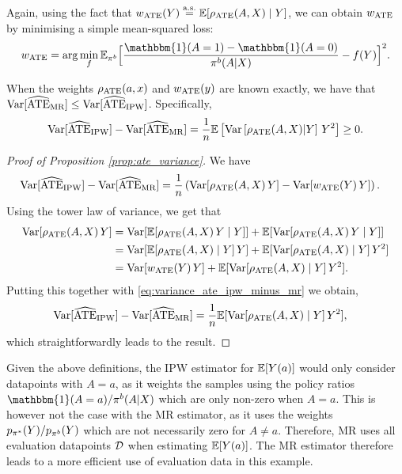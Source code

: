 Again, using the fact that $w_{\textup{ATE}}(Y) \overset{\mathrm{a.s.}}{=} \mathbb{E}[\rho_{\textup{ATE}}(A, X)\mid Y]$, we can obtain $w_{\textup{ATE}}$ by minimising a simple mean-squared loss:
\begin{align*}
    w_{\ate} =\arg \min_{f} \Ebeh \Big[\frac{\mathbbm{1}(A=1)- \mathbbm{1}(A=0)}{\beh (A|X)}-f(Y)\Big]^2.
\end{align*}
\begin{proposition}\label{prop:ate_variance}
When the weights $\rho_{\textup{ATE}}(a, x)$ and $w_{\textup{ATE}}(y)$ are known exactly, we have that $\textup{Var}[\widehat{\textup{ATE}}_{\textup{MR}}] \leq \textup{Var}[\widehat{\textup{ATE}}_{\textup{IPW}}]$. Specifically,
\begin{align*}
    \textup{Var}[\widehat{\textup{ATE}}_{\textup{IPW}}] - \textup{Var}[\widehat{\textup{ATE}}_{\textup{MR}}] = \frac{1}{n}\mathbb{E}\left[ \textup{Var}\left[\rho_{\textup{ATE}}(A, X) | Y \right]\,Y^2 \right] \geq 0.
\end{align*}
\end{proposition}
\begin{proof}[Proof of Proposition \ref{prop:ate_variance}] We have
\begin{align}
    \textup{Var}[\widehat{\textup{ATE}}_{\textup{IPW}}] - \textup{Var}[\widehat{\textup{ATE}}_{\textup{MR}}] &= \frac{1}{n}\left( \textup{Var}[\rho_{\textup{ATE}}(A, X)\, Y] - \textup{Var}[w_{\textup{ATE}}(Y)\,Y] \right). \label{eq:variance_ate_ipw_minus_mr}
\end{align}
Using the tower law of variance, we get that
\begin{align*}
    \textup{Var}[\rho_{\textup{ATE}}(A, X)\, Y] 
    &= \textup{Var}[\mathbb{E}[\rho_{\textup{ATE}}(A, X)\,  Y\mid Y]] + \mathbb{E}[\textup{Var}[\rho_{\textup{ATE}}(A, X)\, Y\mid Y]]\\
    &= \textup{Var}[\mathbb{E}[\rho_{\textup{ATE}}(A, X)\mid Y]\,  Y] + \mathbb{E}[\textup{Var}[\rho_{\textup{ATE}}(A, X)\mid Y]\,Y^2]\\
    &= \textup{Var}[w_{\textup{ATE}}(Y)\,Y] + \mathbb{E}[\textup{Var}[\rho_{\textup{ATE}}(A, X)\mid Y]\,Y^2].
\end{align*}
Putting this together with \eqref{eq:variance_ate_ipw_minus_mr} we obtain,
\begin{align*}
    \textup{Var}[\widehat{\textup{ATE}}_{\textup{IPW}}] - \textup{Var}[\widehat{\textup{ATE}}_{\textup{MR}}] &= \frac{1}{n} \mathbb{E}[\textup{Var}[\rho_{\textup{ATE}}(A, X)\mid Y]\,Y^2],
\end{align*}
which straightforwardly leads to the result.
\end{proof}

Given the above definitions, the IPW estimator for $\mathbb{E}[Y(a)]$ would only consider datapoints with $A=a$, as it weights the samples using the policy ratios $\mathbbm{1}(A=a)/\beh(A|X)$ which are only non-zero when $A=a$. 
This is however not the case with the MR estimator, as it uses the weights $p_{\pi^*}(Y)/p_{\pi^b}(Y)$ which are not necessarily zero for $A\neq a$. Therefore, MR uses all evaluation datapoints $\mathcal{D}$ when estimating $\mathbb{E}[Y(a)]$. The MR estimator therefore leads to a more efficient use of evaluation data in this example. 

